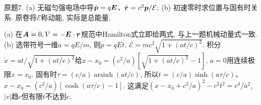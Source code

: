 \begin{exercise}
原题7. (a) 无磁匀强电场中导$\dot{\boldsymbol{p}}=q\boldsymbol{E}$、$\dot{\boldsymbol{r}}=c^2\boldsymbol{p}/\mathcal E$; (b) 初速零时求位置与固有时关系. 原卷将$\mathcal E$称动能, 实际是总能量.
\end{exercise}
\begin{solution}
(a) 在$\boldsymbol{A}=0,V=-\boldsymbol{E}\cdot\boldsymbol{r}$规范中Hamilton式立即给两式, 与上一题机械动量式一致. (b) 选带符号一维$a=qE/m$, 则$p=qEt$, $\mathcal E=mc^2\sqrt{1+(at/c)^2}$. 积分$\dot x=at/\sqrt{1+(at/c)^2}$给$x-x_0=(c^2/a)[\sqrt{1+(at/c)^2}-1]$, $a=0$用连续极限$x=x_0$. 固有时$\tau=(c/a)\operatorname{arsinh}(at/c)$, 所以$t=(c/a)\sinh(a\tau/c)$、$x-x_0=(c^2/a)[\cosh(a\tau/c)-1]$. 这满足$(x-x_0+c^2/a)^2-c^2t^2=c^4/a^2$, $|v|$趋$c$但有限$t$不达到$c$.
\end{solution}
